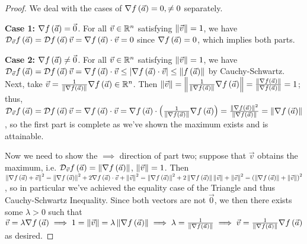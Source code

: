 \documentclass[main.tex]{subfiles}
\begin{document}
\begin{proof}
    We deal with the cases of $\nabla f\left( \vec{a} \right) = 0, \neq 0$ separately.
    
    \textbf{Case 1:} $\nabla f\left( \vec{a} \right) = \vec{0}$. For all $\vec{v}\in \mathbb R^n$ satisfying $\left\lVert \vec{v} \right\rVert = 1$, we have $\mathcal{D}_{\vec{v}}f\left( \vec{a} \right) = \mathcal{D}f\left( \vec{a} \right)\vec{v} = \nabla f\left( \vec{a} \right) \cdot \vec{v} = 0$ since $\nabla f\left( \vec{a} \right) = 0$, which implies both parts.

    \textbf{Case 2:} $\nabla f\left( \vec{a} \right) \neq \vec{0}$. For all $\vec{v}\in \mathbb R^n$ satisfying $\left\lVert \vec{v} \right\rVert = 1$, we have $\mathcal{D}_{\vec{v}}f\left( \vec{a} \right) = \mathcal{D}f\left( \vec{a} \right)\vec{v} = \nabla f\left( \vec{a} \right) \cdot \vec{v} \le \left\lvert \nabla f\left( \vec{a} \right) \cdot \vec{v} \right\rvert \le \left\lVert f\left( \vec{a} \right) \right\rVert$ by Cauchy-Schwartz. Next, take $\vec{v} = \frac{1}{\left\lVert \nabla f\left( \vec{a} \right) \right\rVert} \nabla f\left( \vec{a} \right)\in \mathbb R^n$. Then $\left\lVert \vec{v} \right\rVert = \left\lVert \frac{1}{\left\lVert \nabla f\left( \vec{a} \right) \right\rVert} \nabla f\left( \vec{a} \right) \right\rVert = \frac{\left\lVert \nabla f\left( \vec{a} \right) \right\rVert}{\left\lVert \nabla f\left( \vec{a} \right) \right\rVert} = 1$; thus, $\mathcal{D}_{\vec{v}}f\left( \vec{a} \right) = \mathcal{D}f\left( \vec{a} \right)\vec{v} = \nabla f\left( \vec{a} \right) \cdot \vec{v} = \nabla f\left( \vec{a} \right)\cdot \left( \frac{1}{\left\lVert \nabla f\left( \vec{a} \right) \right\rVert}\nabla f\left( \vec{a} \right) \right) = \frac{\left\lVert \nabla f\left( \vec{a} \right) \right\rVert^2}{\left\lVert \nabla f\left( \vec{a} \right) \right\rVert} = \left\lVert \nabla f\left( \vec{a} \right) \right\rVert$, so the first part is complete as we've shown the maximum exists and is attainable.

    Now we need to show the $\implies$ direction of part two; suppose that $\vec{v}$ obtains the maximum, i.e. $\mathcal{D}_{\vec{v}} f\left( \vec{a} \right) = \left\lVert \nabla f\left( \vec{a} \right) \right\rVert$, $\left\lVert \vec{v} \right\rVert = 1$. Then $\left\lVert \nabla f\left( \vec{a} \right) + \vec{v} \right\rVert^2 = \left\lVert \nabla f\left( \vec{a} \right) \right\rVert^2 + 2\nabla f\left( \vec{a} \right) \cdot \vec{v} + \left\lVert \vec{v} \right\rVert^2 = \left\lVert \nabla f\left( \vec{a} \right) \right\rVert^2 + 2\left\lVert \nabla f\left( \vec{a} \right) \right\rVert\left\lVert \vec{v} \right\rVert + \left\lVert \vec{v} \right\rVert^2 = \left( \left\lVert \nabla f\left( \vec{a} \right) \right\rVert + \left\lVert \vec{v} \right\rVert \right)^2$, so in particular we've achieved the equality case of the Triangle and thus Cauchy-Schwartz Inequality. Since both vectors are not $\vec{0}$, we then there exists some $\lambda > 0$ such that $\vec{v} = \lambda\nabla f\left( \vec{a} \right)\implies 1 = \left\lVert \vec{v} \right\rVert = \lambda\left\lVert \nabla f\left( \vec{a} \right) \right\rVert\implies \lambda = \frac{1}{\left\lVert \nabla f\left( \vec{a} \right) \right\rVert}\implies \vec{v} = \frac{1}{\left\lVert \nabla f\left( \vec{a} \right) \right\rVert}\nabla f\left( \vec{a} \right)$ as desired.
\end{proof}
\end{document}
